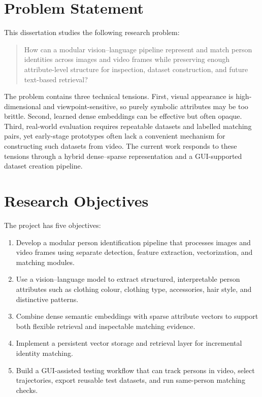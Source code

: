 \section{Problem Statement}

This dissertation studies the following research problem:

\begin{quote}
How can a modular vision--language pipeline represent and match person identities across images and video frames while preserving enough attribute-level structure for inspection, dataset construction, and future text-based retrieval?
\end{quote}

The problem contains three technical tensions. First, visual appearance is high-dimensional and viewpoint-sensitive, so purely symbolic attributes may be too brittle. Second, learned dense embeddings can be effective but often opaque. Third, real-world evaluation requires repeatable datasets and labelled matching pairs, yet early-stage prototypes often lack a convenient mechanism for constructing such datasets from video. The current work responds to these tensions through a hybrid dense--sparse representation and a GUI-supported dataset creation pipeline.

\section{Research Objectives}

The project has five objectives:

\begin{enumerate}
  \item Develop a modular person identification pipeline that processes images and video frames using separate detection, feature extraction, vectorization, and matching modules.
  \item Use a vision--language model to extract structured, interpretable person attributes such as clothing colour, clothing type, accessories, hair style, and distinctive patterns.
  \item Combine dense semantic embeddings with sparse attribute vectors to support both flexible retrieval and inspectable matching evidence.
  \item Implement a persistent vector storage and retrieval layer for incremental identity matching.
  \item Build a GUI-assisted testing workflow that can track persons in video, select trajectories, export reusable test datasets, and run same-person matching checks.
\end{enumerate}

